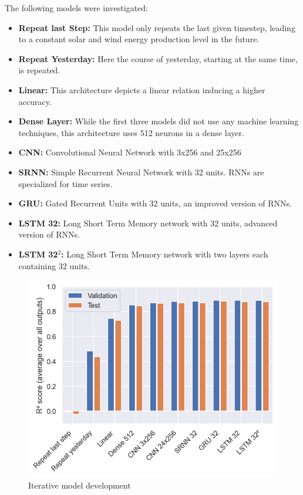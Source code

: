 \documentclass[11pt,table]{article}
\begin{document}
The following models were investigated:

\begin{itemize}
\item \textbf{Repeat last Step:} This model only repeats the last given timestep, leading to a constant solar and wind energy production level in the future. 
\item \textbf{Repeat Yesterday:} Here the course of yesterday, starting at the same time, is repeated. 
\item \textbf{Linear:} This architecture depicts a linear relation inducing a higher accuracy.
\item \textbf{Dense Layer:} While the first three models did not use any machine learning techniques, this architecture uses 512 neurons in a dense layer. 
\item \textbf{CNN:} Convolutional Neural Network with 3x256 and 25x256
\item \textbf{SRNN:} Simple Recurrent Neural Network with 32 units. RNNs are specialized for time series.
\item \textbf{GRU:} Gated Recurrent Units with 32 units, an improved version of RNNs. 
\item \textbf{LSTM 32:} Long Short Term Memory network with 32 units, advanced version of RNNs.
\item \textbf{LSTM 32$^2$:} Long Short Term Memory network with two layers each containing 32 units.
\end{itemize}


\begin{figure}[H]
	\centering
	\includegraphics[scale=0.6]{Figures/benchmarks.png}
	\caption{Iterative model development}
	\label{fig:benchmarks}
\end{figure} 
\end{document}
